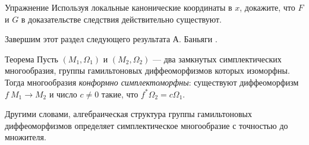 \begin{thm*}{Упражнение}
Используя локальные канонические координаты в $x$, докажите, что $F$ и $G$ в доказательстве следствия действительно существуют.
\end{thm*}

Завершим этот раздел  следующего результата А. Баньяги \cite{B2}.

\begin{thm}{Теорема}\label{1.5.D}
Пусть $(M_1, \Omega_1)$ и $(M_2, \Omega_2)$ --- два замкнутых симплектических многообразия, группы гамильтоновых диффеоморфизмов которых изоморфны.
Тогда многообразия \emph{конформно симплектоморфны}: существуют диффеоморфизм $f\: M_1 \to  M_2$ и число $c \ne 0$ такие, что $f^\ast \Omega_2 = c\Omega_1$. 
\end{thm}

Другими словами, алгебраическая структура группы гамильтоновых диффеоморфизмов определяет симплектическое многообразие с точностью до множителя.



